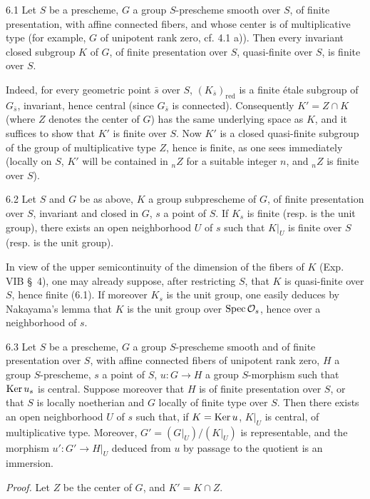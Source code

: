 \begin{proposition}{6.1}\label{XVI.6.1}
Let $S$ be a prescheme, $G$ a group $S$-prescheme smooth over $S$, of finite presentation, with affine connected fibers, and whose center is of multiplicative type (for example, $G$ of unipotent rank zero, cf. 4.1 a)). Then every invariant closed subgroup $K$ of $G$, of finite presentation over $S$, quasi-finite over $S$, is finite over $S$.
\end{proposition}
Indeed, for every geometric point $\bar s$ over $S$, $(K_{\bar s})_{\mathrm{red}}$ is a finite étale subgroup of $G_{\bar s}$, invariant, hence central (since $G_{\bar s}$ is connected). Consequently $K'=Z\cap K$ (where $Z$ denotes the center of $G$) has the same underlying space as $K$, and it suffices to show that $K'$ is finite over $S$. Now $K'$ is a closed quasi-finite subgroup of the group of multiplicative type $Z$, hence is finite, as one sees immediately (locally on $S$, $K'$ will be contained in ${}_nZ$ for a suitable integer $n$, and ${}_nZ$ is finite over $S$).
\begin{corollary}{6.2}\label{XVI.6.2}
Let $S$ and $G$ be as above, $K$ a group subprescheme of $G$, of finite presentation over $S$, invariant and closed in $G$, $s$ a point of $S$. If $K_s$ is finite (resp. is the unit group), there exists an open neighborhood $U$ of $s$ such that $K|_U$ is finite over $S$ (resp. is the unit group).
\end{corollary}
In view of the upper semicontinuity of the dimension of the fibers of $K$ (Exp. VIB \S\ 4), one may already suppose, after restricting $S$, that $K$ is quasi-finite over $S$, hence finite (6.1). If moreover $K_s$ is the unit group, one easily deduces by Nakayama's lemma that $K$ is the unit group over $\operatorname{Spec}\mathcal{O}_s$, hence over a neighborhood of $s$.
\begin{proposition}{6.3}\label{XVI.6.3}
Let $S$ be a prescheme, $G$ a group $S$-prescheme smooth and of finite presentation over $S$, with affine connected fibers of unipotent rank zero, $H$ a group $S$-prescheme, $s$ a point of $S$, $u:G\to H$ a group $S$-morphism such that $\operatorname{Ker} u_s$ is central. Suppose moreover that $H$ is of finite presentation over $S$, or that $S$ is locally noetherian and $G$ locally of finite type over $S$. Then there exists an open neighborhood $U$ of $s$ such that, if $K=\operatorname{Ker} u$, $K|_U$ is central, of multiplicative type. Moreover, $G'=(G|_U)/(K|_U)$ is representable, and the morphism $u':G'\to H|_U$ deduced from $u$ by passage to the quotient is an immersion.
\end{proposition}
\par\noindent\emph{Proof.}
Let $Z$ be the center of $G$, and $K'=K\cap Z$.

